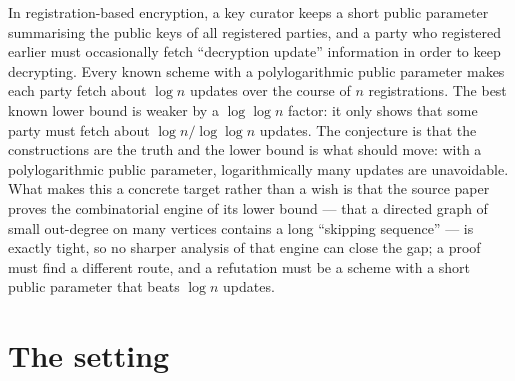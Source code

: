 \documentclass{aicr-conjecture}
\begin{document}

\vspace{0.4em}

\begin{informalconjecture}
In registration-based encryption, a key curator keeps a short public
parameter summarising the public keys of all registered parties, and a
party who registered earlier must occasionally fetch ``decryption
update'' information in order to keep decrypting. Every known scheme
with a polylogarithmic public parameter makes each party fetch about
$\log n$ updates over the course of $n$ registrations. The best known
lower bound is weaker by a $\log\log n$ factor: it only shows that some
party must fetch about $\log n / \log\log n$ updates. The conjecture is
that the constructions are the truth and the lower bound is what should
move: with a polylogarithmic public parameter, logarithmically many
updates are unavoidable. What makes this a concrete target rather than
a wish is that the source paper proves the combinatorial engine of its
lower bound --- that a directed graph of small out-degree on many
vertices contains a long ``skipping sequence'' --- is exactly tight, so
no sharper analysis of that engine can close the gap; a proof must find
a different route, and a refutation must be a scheme with a short
public parameter that beats $\log n$ updates.
\end{informalconjecture}

\section{The setting}\label{sec:setting}
\end{document}
